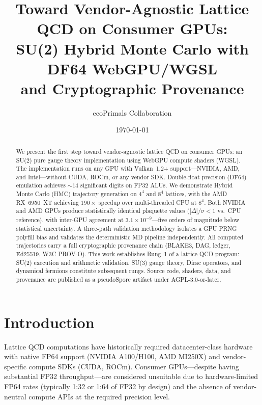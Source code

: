 \documentclass[aps,prl,twocolumn,superscriptaddress,showpacs]{revtex4-2}
\begin{document}
\title{Toward Vendor-Agnostic Lattice QCD on Consumer GPUs:\\
SU(2) Hybrid Monte Carlo with DF64 WebGPU/WGSL\\
and Cryptographic Provenance}

\author{ecoPrimals Collaboration}

\date{\today}

\begin{abstract}
We present the first step toward vendor-agnostic lattice QCD on consumer
GPUs: an SU(2) pure gauge theory implementation using WebGPU compute
shaders (WGSL). The implementation runs on any GPU with Vulkan~1.2+
support---NVIDIA, AMD, and Intel---without CUDA, ROCm, or any vendor
SDK. Double-float precision (DF64) emulation achieves ${\sim}14$
significant digits on FP32 ALUs. We demonstrate Hybrid Monte Carlo (HMC)
trajectory generation on $4^4$ and $8^4$ lattices, with the AMD
RX~6950~XT achieving $190\times$ speedup over multi-threaded CPU at
$8^4$. Both NVIDIA and AMD GPUs produce statistically identical
plaquette values ($|\Delta|/\sigma < 1$ vs.\ CPU reference), with
inter-GPU agreement at $3.1 \times 10^{-9}$---five orders of magnitude
below statistical uncertainty. A three-path validation methodology
isolates a GPU PRNG polyfill bias and validates the deterministic MD
pipeline independently. All computed trajectories carry a full
cryptographic provenance chain (BLAKE3, DAG, ledger, Ed25519, W3C
PROV-O). This work establishes Rung~1 of a lattice QCD program: SU(2)
execution and arithmetic validation. SU(3) gauge theory, Dirac
operators, and dynamical fermions constitute subsequent rungs. Source
code, shaders, data, and provenance are published as a pseudoSpore
artifact under AGPL-3.0-or-later.
\end{abstract}

\maketitle

\section{Introduction}
\label{sec:intro}

Lattice QCD computations have historically required datacenter-class
hardware with native FP64 support (NVIDIA A100/H100, AMD MI250X) and
vendor-specific compute SDKs (CUDA, ROCm). Consumer GPUs---despite
having substantial FP32 throughput---are considered unsuitable due to
hardware-limited FP64 rates (typically 1:32 or 1:64 of FP32 by design)
and the absence of vendor-neutral compute APIs at the required precision
level.
\end{document}
